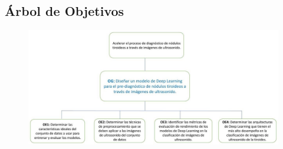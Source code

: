 	
	\label{anexo2}
	\begin{landscape}
		\section{Árbol de Objetivos}
	\begin{figure}[H]
		\centering
			\includegraphics[width=\linewidth]{anexos/arb_objetivos.jpg}
	\end{figure}
	\end{landscape}
	\clearpage
	
